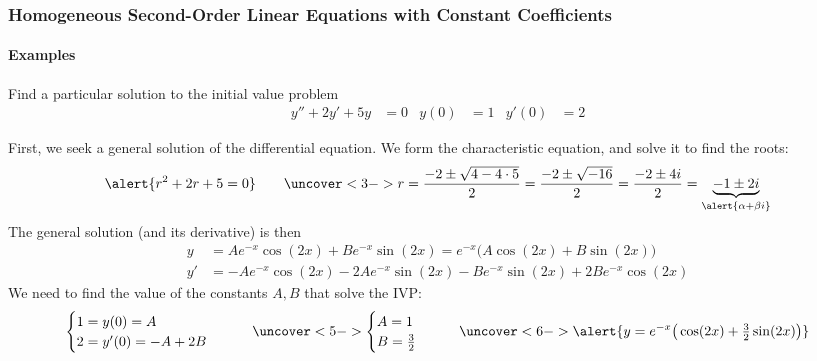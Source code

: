 \documentclass[9pt,xcolor=x11names,compress]{beamer}
\begin{document}
\begin{frame}\frametitle{Homogeneous Second-Order Linear Equations with Constant Coefficients}
\framesubtitle{Examples}
\begin{block}
	{Find a particular solution to the initial value problem}
	\begin{align*}
		y''+2y'+5y&=0 &y(0)&=1 &y'(0)&=2
	\end{align*}
\end{block}
\pause First, we seek a general solution of the differential equation.  We form the characteristic equation, and solve it to find the roots:
\begin{equation*}
	\alert{r^2+2r+5=0}\qquad 
	\uncover<3->{r=\frac{-2\pm \sqrt{4-4\cdot 5}}{2}=\frac{-2\pm \sqrt{-16}}{2}=\frac{-2\pm 4i}{2} = \underbrace{-1\pm 2i}_{\alert{\alpha+\beta i}}}
\end{equation*}
\pause The general solution (and its derivative) is then 
\begin{align*}
	y&=Ae^{-x}\cos(2x)+Be^{-x}\sin(2x)=e^{-x}\big(A\cos(2x)+B\sin(2x)\big) \\
	y'&=-Ae^{-x}\cos(2x)-2Ae^{-x}\sin(2x)-Be^{-x}\sin(2x)+2Be^{-x}\cos(2x)
\end{align*}
\pause We need to find the value of the constants $A,B$ that solve the IVP:
\begin{equation*}
\begin{cases}
	1=y(0)=A \\ 2=y'(0)=-A+2B
\end{cases}\qquad
\uncover<5->{\begin{cases}
	A=1 \\B=\tfrac{3}{2}
\end{cases}\qquad}
\uncover<6->{\alert{y=e^{-x}\big(\cos(2x)+\tfrac{3}{2}\sin(2x)\big)}}
\end{equation*}
\end{frame}
\end{document}
